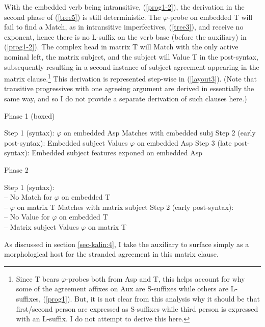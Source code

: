 \documentclass[output=paper
,modfonts
,nonflat]{langsci/langscibook}
\begin{document}
With the embedded verb being intransitive, (\ref{prog1-2}), the derivation in the second phase of (\ref{tree5}) is still deterministic. The $\varphi$-probe on embedded T will fail to find a Match, as in intransitive imperfectives, (\ref{tree3}), and receive no exponent, hence there is no L-suffix on the verb base (before the auxiliary) in (\ref{prog1-2}). The complex head in matrix T will Match with the only active nominal left, the matrix subject, and the subject will Value T in the post-syntax, subsequently resulting in a second instance of subject agreement appearing in the matrix clause.\footnote{Since T bears $\varphi$-probes both from Asp and T, this helps account for why some of the agreement affixes on Aux are S-suffixes while others are L-suffixes, (\ref{prog1}). But, it is not clear from this analysis why it should be that first/second  person are expressed as S-suffixes while third person is expressed with an L-suffix. I do not attempt to derive this here.} This derivation is represented step-wise in (\ref{layout3}). (Note that transitive progressives with one agreeing argument are derived in essentially the same way, and so I do not provide a separate derivation of such clauses here.)

\eal \label{layout3}
\ex Phase 1 (boxed)
\begin{xlist}
\ex Step 1 (syntax): $\varphi$ on embedded Asp Matches with embedded subj
\ex Step 2 (early post-syntax): Embedded subject Values $\varphi$ on embedded Asp
\ex Step 3 (late post-syntax): Embedded subject features exponed on embedded Asp
\end{xlist}
\ex Phase 2
\begin{xlist}
\ex Step 1 (syntax):\\-- No Match for $\varphi$ on embedded T\\-- $\varphi$ on matrix T Matches with matrix subject
\ex Step 2 (early post-syntax):\\-- No Value for $\varphi$ on embedded T\\-- Matrix subject Values $\varphi$ on matrix T
\end{xlist}
\zl

\noindent As discussed in section \ref{sec-kalin:4}, I take the auxiliary to surface simply as a morphological host for the stranded agreement in this matrix clause. 
\end{document}
